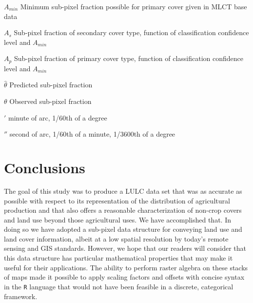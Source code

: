 \documentclass[draftthesis]{neiuthesis}
\begin{document}
\begin{symbollist}[0.7in]
\item[$A_{min}$] Minimum sub-pixel fraction possible for primary cover
  given in MLCT base data
\item[$A_s$] Sub-pixel fraction of secondary cover type, function of
  classification confidence level and $A_{min}$
\item[$A_p$] Sub-pixel fraction of primary cover type, function of
  classification confidence level and $A_{min}$
\item[$\hat\theta$] Predicted sub-pixel fraction
\item[$\theta$] Observed sub-pixel fraction
\item[$'$] minute of arc, 1/60th of a degree
\item[$''$] second of arc, 1/60th of a minute, 1/3600th of a degree
\end{symbollist}


\mainmatter

\todototoc
\listoftodos





\chapter{Conclusions}
\label{cha:conclusions}

The goal of this study was to produce a LULC data set that was as
accurate as possible with respect to its representation of the
distribution of agricultural production and that also offers a
reasonable characterization of non-crop covers and land use beyond
those agricultural uses.  We have accomplished that.  In doing so we
have adopted a sub-pixel data structure for conveying land use and
land cover information, albeit at a low spatial resolution by today's
remote sensing and GIS standards.  However, we hope that our readers
will consider that this data structure has particular mathematical
properties that may make it useful for their applications.  The
ability to perform raster algebra on these stacks of maps made it
possible to apply scaling factors and offsets with concise syntax in
the \texttt{R} language that would not have been feasible in a
discrete, categorical framework.
\end{document}
